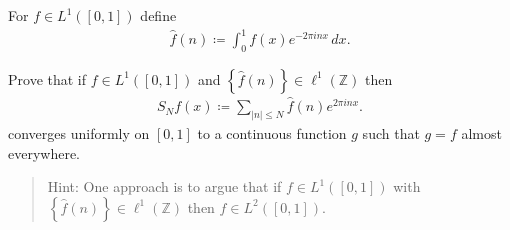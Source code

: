 For \(f\in L^1([0, 1])\) define
\begin{align*}
\widehat{f}(n) \coloneqq\int _0^1 f(x) e^{-2\pi i n x} \, dx
.\end{align*}

Prove that if \(f\in L^1([0, 1])\) and
\(\left\{{\widehat{f}(n)}\right\} \in \ell^1({\mathbb{Z}})\) then
\begin{align*}
S_N f(x) \coloneqq\sum_{{\left\lvert {n} \right\rvert} \leq N} \widehat{f} (n) e^{2 \pi i n x}
.\end{align*}
converges uniformly on \([0, 1]\) to a continuous function \(g\) such
that \(g = f\) almost everywhere.

\begin{quote}
Hint: One approach is to argue that if \(f\in L^1([0, 1])\) with
\(\left\{{\widehat{f} (n)}\right\} \in \ell^1({\mathbb{Z}})\) then
\(f\in L^2([0, 1])\).
\end{quote}

